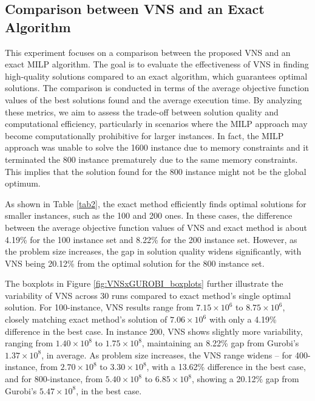 \documentclass[sn-nature]{sn-jnl}%
\theoremstyle{thmstyleone}%
\theoremstyle{thmstyletwo}%
\theoremstyle{thmstylethree}%
\begin{document}
\subsection{Comparison between VNS and an Exact Algorithm}

This experiment focuses on a comparison between the proposed VNS and an exact MILP algorithm. The goal is to evaluate the effectiveness of VNS in finding high-quality solutions compared to an exact algorithm, which guarantees optimal solutions. The comparison is conducted in terms of the average objective function values of the best solutions found and the average execution time. By analyzing these metrics, we aim to assess the trade-off between solution quality and computational efficiency, particularly in scenarios where the MILP approach may become computationally prohibitive for larger instances. In fact, the MILP approach was unable to solve the 1600 instance due to memory constraints and it terminated the 800 instance prematurely due to the same memory constraints. This implies that the solution found for the 800 instance might not be the global optimum.

As shown in Table \ref{tab2}, the exact method efficiently finds optimal solutions for smaller instances, such as the 100 and 200 ones. 
In these cases, the difference between the average objective function values of VNS and exact method is about 4.19\% for the 100 instance set and 8.22\% 
for the 200 instance set. However, as the problem size increases, the gap in solution quality widens significantly, with VNS being 20.12\% from the optimal 
solution for the 800 instance set.

The boxplots in Figure \ref{fig:VNSxGUROBI_boxplots} further illustrate the variability of VNS across 30 runs compared to exact method's single optimal solution. 
For 100-instance, VNS results range from $7.15 \times 10^6$ to $8.75 \times 10^6$, closely matching exact method's solution of $7.06 \times 10^6$ 
with only a 4.19\% difference in the best case. In instance 200, VNS shows slightly more variability, ranging from $1.40 \times 10^8$ to $1.75 \times 10^8$, 
maintaining an 8.22\% gap from Gurobi's $1.37 \times 10^8$, in average. As problem size increases, the VNS range widens -- for 400-instance, from 
$2.70 \times 10^8$ to $3.30 \times 10^8$, with a 13.62\% difference in the best case, and for 800-instance, from $5.40 \times 10^8$ to $6.85 \times 10^8$, 
showing a 20.12\% gap from Gurobi's $5.47 \times 10^8$, in the best case. %
\end{document}
